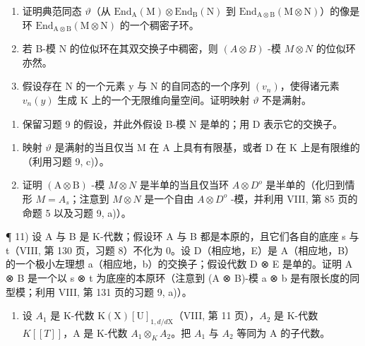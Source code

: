 \begin{enumerate}
\def\labelenumi{\alph{enumi})}
\item
  证明典范同态 \(\vartheta\)（从 \(\mathrm{End}_{\mathrm{A}}(\mathrm{M})\otimes \mathrm{End}_{\mathrm{B}}(\mathrm{N})\) 到 \(\mathrm{End}_{\mathrm{A}\otimes \mathrm{B}}(\mathrm{M}\otimes \mathrm{N})\)）的像是环 \(\mathrm{End}_{\mathrm{A}\otimes \mathrm{B}}(\mathrm{M}\otimes \mathrm{N})\) 的一个稠密子环。
\item
  若 B-模 N 的位似环在其双交换子中稠密，则 \((A \otimes B)\) -模 \(M \otimes N\) 的位似环亦然。
\item
  假设存在 N 的一个元素 y 与 N 的自同态的一个序列 \((v_{n})\)，使得诸元素 \(v_{n}(y)\) 生成 K 上的一个无限维向量空间。证明映射 \(\vartheta\) 不是满射。
\end{enumerate}

\begin{enumerate}
\def\labelenumi{\arabic{enumi})}
\setcounter{enumi}{9}
\tightlist
\item
  保留习题 9 的假设，并此外假设 B-模 N 是单的；用 D 表示它的交换子。
\end{enumerate}

\begin{enumerate}
\def\labelenumi{\alph{enumi})}
\item
  映射 \(\vartheta\) 是满射的当且仅当 M 在 A 上具有有限基，或者 D 在 K 上是有限维的（利用习题 9, c)）。
\item
  证明 \((\mathrm{A} \otimes \mathrm{B})\) -模 \(M \otimes N\) 是半单的当且仅当环 \(A \otimes D^{o}\) 是半单的（化归到情形 \(M = A_{s}\)；注意到 \(M \otimes N\) 是一个自由 \(A \otimes D^{o}\) -模，并利用 VIII, 第 85 页的命题 5 以及习题 9, a)）。
\end{enumerate}

¶ 11) 设 A 与 B 是 K-代数；假设环 A 与 B 都是本原的，且它们各自的底座 s 与 t（VIII, 第 130 页，习题 8）不化为 0。设 D（相应地，E）是 A（相应地，B）的一个极小左理想 a（相应地，b）的交换子；假设代数 D ⊗ E 是单的。证明 A ⊗ B 是一个以 s ⊗ t 为底座的本原环（注意到 (A ⊗ B)-模 a ⊗ b 是有限长度的同型模；利用 VIII, 第 131 页的习题 9, a)）。

\begin{enumerate}
\def\labelenumi{\arabic{enumi})}
\setcounter{enumi}{11}
\tightlist
\item
  设 \(A_{1}\) 是 K-代数 \(\mathrm{K}(\mathrm{X})[\mathrm{U}]_{1,d/d\mathrm{X}}\)（VIII, 第 11 页），\(A_{2}\) 是 K-代数 \(K[[T]]\)，A 是 K-代数 \(A_{1} \otimes_{K} A_{2}\)。把 \(A_{1}\) 与 \(A_{2}\) 等同为 A 的子代数。
\end{enumerate}

